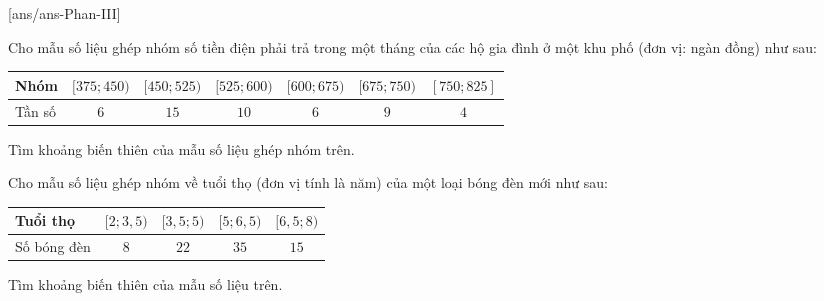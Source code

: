 \TNSA
{}[ans/ans\currfilebase-Phan-III]

\begin{ex}%
 Cho mẫu số liệu ghép nhóm số tiền điện phải trả trong một tháng của các hộ gia đình ở một khu phố (đơn vị: ngàn đồng) như sau:
\begin{center}
 \begin{tabular}{|l|c|c|c|c|c|c|}
 \hline
 Nhóm & $[375; 450)$ & $[450; 525)$ & $[525; 600)$ & $[600; 675)$ & $[675; 750)$ & $[750; 825]$\\
 \hline
 Tần số & $6$ & $15$ & $10$ & $6$ & $9$ & $4$ \\
 \hline
 \end{tabular}
\end{center}
 Tìm khoảng biến thiên của mẫu số liệu ghép nhóm trên.
 
\end{ex}

\begin{ex}%
 Cho mẫu số liệu ghép nhóm về tuổi thọ (đơn vị tính là năm) của một loại bóng đèn mới như sau:
 \begin{center}
 \begin{tabular}{|l|c|c|c|c|}
 \hline
 Tuổi thọ & $[2; 3{,}5)$ & $[3{,}5; 5)$ & $[5; 6{,}5)$ & $[6{,}5; 8)$\\
 \hline
 Số bóng đèn & $8$ & $22$ & $35$ & $15$ \\
 \hline
 \end{tabular}
 \end{center}
 Tìm khoảng biến thiên của mẫu số liệu trên.
 
\end{ex}

